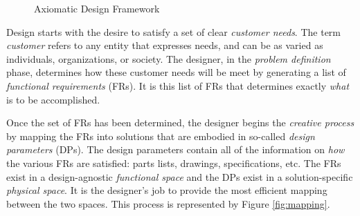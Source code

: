 \begin{figure}[h]
  \label{fig:design}
  \begin{center}
  \end{center}
  \caption{Axiomatic Design Framework}
\end{figure}

Design starts with the desire to satisfy a set of clear \emph{customer needs}.  The term \emph{customer} refers to
any entity that expresses needs, and can be as varied as individuals, organizations, or society.  The designer, in
the \emph{problem definition} phase, determines how these customer needs will be meet by generating a list of
\emph{functional requirements} (FRs).  It is this list of FRs that determines exactly \emph{what} is to be
accomplished.

Once the set of FRs has been determined, the designer begins the \emph{creative process} by mapping the FRs into
solutions that are embodied in so-called \emph{design parameters} (DPs).  The design parameters contain all of the
information on \emph{how} the various FRs are satisfied: parts lists, drawings, specifications, etc.  The FRs exist
in a design-agnostic \emph{functional space} and the DPs exist in a solution-specific \emph{physical space}.  It is
the designer's job to provide the most efficient mapping between the two spaces.  This process is represented by
Figure \ref{fig:mapping}.

